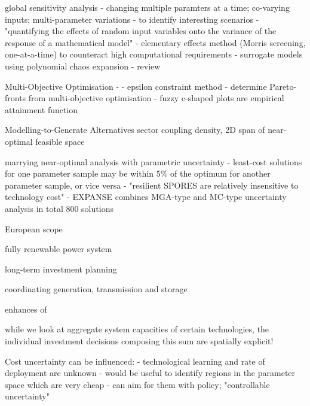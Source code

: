 global sensitivity analysis
- changing multiple paramters at a time; co-varying inputs; multi-parameter variations
- to identify interesting scenarios \cite{usher_value_2015}
- "quantifying the effects of random input variables onto the variance of the response of a mathematical model" \cite{sudret_global_2008}
- elementary effects method (Morris screening, one-at-a-time) to counteract high computational requirements \cite{usher_value_2015} \cite{pizarro-alonso_uncertainties_2019} \cite{moret_robust_2016}
- surrogate models using polynomial chaos expansion
- review \cite{iooss_review_2014}

Multi-Objective Optimisation
- \cite{nearoptimal}
- epsilon constraint method
- determine Pareto-fronts from multi-objective optimisation \cite{mavrotas_effective_2009}
- fuzzy c-shaped plots are empirical attainment function \cite{binois_quantifying_2015} \cite{de_cursi_uncertainty_2021}

Modelling-to-Generate Alternatives
\cite{DeCarolis2016}
\cite{Price2017}
\cite{nacken_integrated_2019} sector coupling
\cite{pedersen_modeling_2020} density, 2D span of near-optimal feasible space


marrying near-optimal analysis with parametric uncertainty
- least-cost solutions for one parameter sample may be within 5\% of the optimum for another parameter sample, or vice versa
- "resilient SPORES are relatively insensitive to technology cost" \cite{lombardi_policy_2020}
- EXPANSE combines MGA-type and MC-type uncertainty analysis in total 800 solutions \cite{Li2017} \cite{Trutnevyte2013}


European scope

fully renewable power system

long-term investment planning

coordinating generation, transmission and storage

enhances of \cite{nearoptimal}

while we look at aggregate system capacities of certain technologies, the individual investment decisions composing this sum are spatially explicit!

Cost uncertainty can be influenced:
- technological learning and rate of deployment are unknown
- would be useful to identify regions in the parameter space which are very cheap
- can aim for them with policy; "controllable uncertainty"


